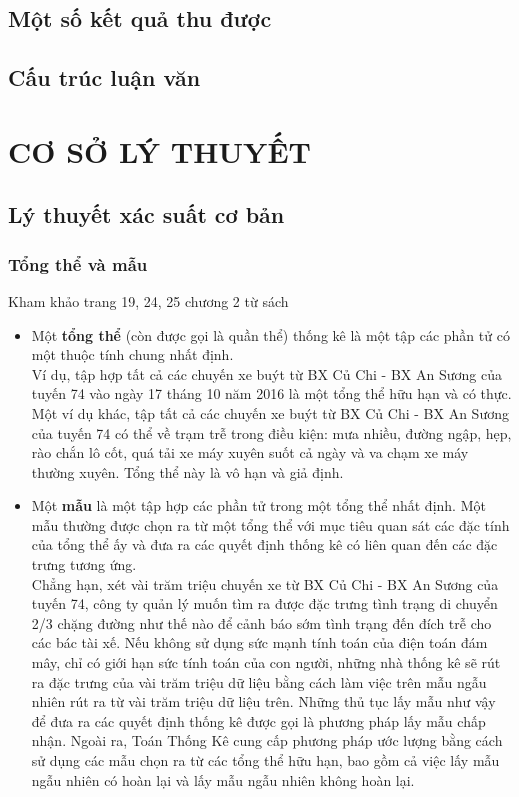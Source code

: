 \documentclass[a4paper, 13pt]{report}
\begin{document}
\section{Một số kết quả thu được}
\section{Cấu trúc luận văn}
\pagebreak
\chapter{CƠ SỞ LÝ THUYẾT}
\section{Lý thuyết xác suất cơ bản}
\subsection*{Tổng thể và mẫu}
Kham khảo trang 19, 24, 25 chương 2 từ sách \cite{TKCNUDR}
\begin{itemize}
\item Một \textbf{tổng thể} (còn được gọi là quần thể) thống kê là một tập các phần tử có một thuộc tính chung nhất định. 
\\Ví dụ, tập hợp tất cả các chuyến xe buýt từ BX Củ Chi - BX An Sương của tuyến 74 vào ngày 17 tháng 10 năm 2016 là một tổng thể hữu hạn và có thực.\\
Một ví dụ khác, tập tất cả các chuyến xe buýt từ BX Củ Chi - BX An Sương của tuyến 74 có thể về trạm trễ trong điều kiện: mưa nhiều, đường ngập, hẹp, rào chắn lô cốt, quá tải xe máy xuyên suốt cả ngày và va chạm xe máy thường xuyên. Tổng thể này là vô hạn và giả định.
\item Một \textbf{mẫu} là một tập hợp các phần tử trong một tổng thể nhất định. Một mẫu thường được chọn ra từ một tổng thể với mục tiêu quan sát các đặc tính của tổng thể ấy và đưa ra các quyết định thống kê có liên quan đến các đặc trưng tương ứng. \\
Chẳng hạn, xét vài trăm triệu chuyến xe từ BX Củ Chi - BX An Sương của tuyến 74, công ty quản lý muốn tìm ra được đặc trưng tình trạng di chuyển 2/3 chặng đường như thế nào để cảnh báo sớm tình trạng đến đích trễ cho các bác tài xế. Nếu không sử dụng sức mạnh tính toán của điện toán đám mây, chỉ có giới hạn sức tính toán của con người, những nhà thống kê sẽ rút ra đặc trưng của vài trăm triệu dữ liệu bằng cách làm việc trên mẫu ngẫu nhiên rút ra từ vài trăm triệu dữ liệu trên. Những thủ tục lấy mẫu như vậy để đưa ra các quyết định thống kê được gọi là phương pháp lấy mẫu chấp nhận. Ngoài ra, Toán Thống Kê cung cấp phương pháp ước lượng bằng cách sử dụng các mẫu chọn ra từ các tổng thể hữu hạn, bao gồm cả việc lấy mẫu ngẫu nhiên có hoàn lại và lấy mẫu ngẫu nhiên không hoàn lại.\\
\end{itemize}
\end{document}

